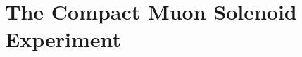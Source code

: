 \ifx\master\undefined\fi

\chapter{The Compact Muon Solenoid Experiment}
\label{ch:detector}

\ifx\master\undefined\fi
